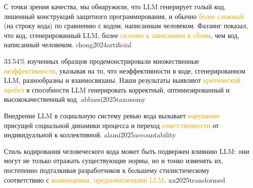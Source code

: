 \documentclass{article}
\newcommand\rus[2]{#1}
\renewcommand\ul[1]{\textcolor{orange}{#1}}
\begin{document}
  {\rus{С точки зрения качества, мы обнаружили, что LLM генерирует голый код, лишенный конструкций защитного программирования, и обычно \ul{более сложный} (на строку кода) по сравнению с кодом, написанным человеком. Фаззинг показал, что код, сгенерированный LLM, более \ul{склонен к зависаниям и сбоям}, чем код, написанный человеком.}{Quality-wise, we found that LLM generates bare-bones code that lacks defensive programming constructs, and is typically \ul{more complex} (per line of code) compared to human-written code. Fuzzing has revealed that LLM-generated code is more \ul{prone to hangs and crashes} than human-written code.}}
  {chong2024artificial}

  {\rus{33.54\% изученных образцов продемонстрировали множественные \ul{неэффективности}, указывая на то, что неэффективности в коде, сгенерированном LLM, разнообразны и взаимосвязаны. Наши результаты выявляют \ul{критический пробел} в способности LLM генерировать корректный, оптимизированный и высококачественный код.}{33.54\% of the studied sample exhibited multiple \ul{inefficiencies}, indicating that inefficiencies in LLM-generated code are diverse and interconnected. Our findings highlight a \ul{critical gap} in LLMs' capability to generate correct, optimized, and high-quality code.}}
  {abbassi2025taxonomy}

  {\rus{Внедрение LLM в социальную систему ревью кода вызывает \ul{нарушение} присущей социальной динамики процесса и переход \ul{ответственности} от индивидуальной к коллективной.}{Introduction of an LLM into the social system of code review causes a \ul{disruption} to the inherent social dynamics of the process and to the transition of \ul{accountability} from individual to collective.}}
  {alami2025accountability}

\lnPitch{\pptSection[2.\rus{Влияние}{Influence}]{2. \rus{Дурное влияние}{Bad Influence}}}

  {\rus{Стиль кодирования человеческого кода может быть подвержен влиянию LLM: они могут не только отражать существующие нормы, но и тонко изменять их, постепенно подталкивая разработчиков к большему стилистическому соответствию с \ul{конвенциями, предпочитаемыми LLM}.}{The coding style of human-written code may be influenced by LLMs: they may not only mirror existing norms but also subtly reshape them, gradually pushing human developers toward greater stylistic alignment with \ul{LLM-preferred conventions}.}}
  {xu2025transformed}
\end{document}
